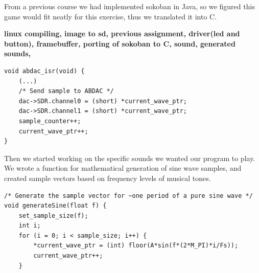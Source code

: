 \documentclass[a4paper,11pt]{article}
\begin{document}
From a previous course we had implemented sokoban in Java, so we figured this game would fit neatly for this exercise, thus we translated it into C. 

\textbf{linux compiling, image to sd, previous assignment, driver(led and button), framebuffer, porting of sokoban to C, sound, generated sounds, }







\begin{lstlisting}
void abdac_isr(void) {
	(...)
	/* Send sample to ABDAC */
	dac->SDR.channel0 = (short) *current_wave_ptr;
	dac->SDR.channel1 = (short) *current_wave_ptr;
	sample_counter++;
	current_wave_ptr++;
}
\end{lstlisting}

Then we started working on the specific sounds we wanted our program to play. We wrote a function for mathematical generation of sine wave samples, and created sample vectors based on frequency levels of musical tones. 

\begin{lstlisting}
/* Generate the sample vector for ~one period of a pure sine wave */
void generateSine(float f) {
	set_sample_size(f);
	int i;
	for (i = 0; i < sample_size; i++) {
		*current_wave_ptr = (int) floor(A*sin(f*(2*M_PI)*i/Fs));
		current_wave_ptr++;
	}
\end{lstlisting}
\end{document}
